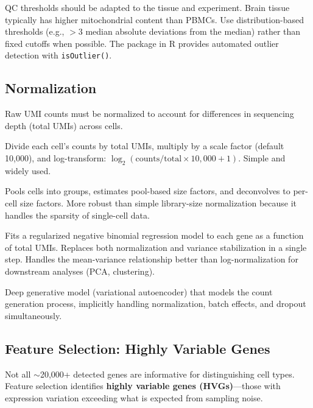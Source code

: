 \begin{tipbox}
QC thresholds should be adapted to the tissue and experiment. Brain tissue
typically has higher mitochondrial content than PBMCs. Use distribution-based
thresholds (e.g., $> 3$ median absolute deviations from the median) rather
than fixed cutoffs when possible. The  package in R provides
automated outlier detection with \texttt{isOutlier()}.
\end{tipbox}

\subsection{Normalization}

Raw UMI counts must be normalized to account for differences in sequencing
depth (total UMIs) across cells.

\begin{description}[style=nextline]
  \item[Log-normalization (Seurat default)] Divide each cell's counts by total
    UMIs, multiply by a scale factor (default 10,000), and log-transform:
    $\log_2(\text{counts}/\text{total} \times 10{,}000 + 1)$. Simple and
    widely used.
  \item[\software{scran} pooling-based normalization] Pools cells into groups,
    estimates pool-based size factors, and deconvolves to per-cell size factors.
    More robust than simple library-size normalization because it handles the
    sparsity of single-cell data.
  \item[\software{SCTransform} (Seurat v3+)] Fits a regularized negative
    binomial regression model to each gene as a function of total UMIs. Replaces
    both normalization and variance stabilization in a single step. Handles
    the mean-variance relationship better than log-normalization for downstream
    analyses (PCA, clustering).
  \item[\software{scVI} (scvi-tools)] Deep generative model (variational
    autoencoder) that models the count generation process, implicitly handling
    normalization, batch effects, and dropout simultaneously.
\end{description}

\subsection{Feature Selection: Highly Variable Genes}

Not all $\sim$20,000+ detected genes are informative for distinguishing cell
types. Feature selection identifies \textbf{highly variable genes (HVGs)}---those
with expression variation exceeding what is expected from sampling noise.

